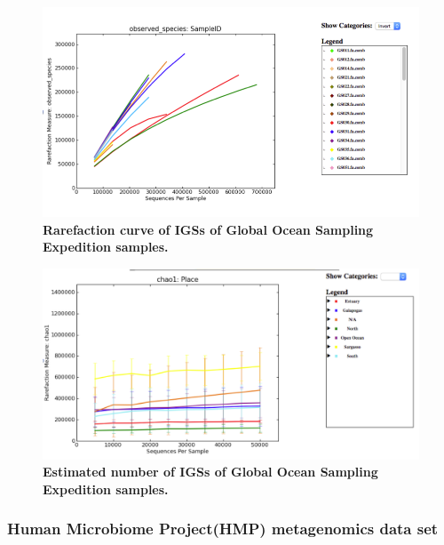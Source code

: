 \documentclass{article}
\begin{document}
\begin{figure}[!ht]
 \centerline{\includegraphics[width=6in]{./figures/GOS_observed.png}}
\caption{\bf Rarefaction curve of IGSs of Global Ocean Sampling Expedition
samples.}
\label{fig:GOS-rarefaction}
\end{figure}

\begin{figure}[!ht]
 \centerline{\includegraphics[width=6in]{./figures/GOS_chao.png}}
\caption{\bf Estimated number of IGSs of Global Ocean Sampling Expedition
 samples.}
\label{fig:GOS-chao1}
\end{figure}




\subsubsection{Human Microbiome Project(HMP) metagenomics data set}
\end{document}
